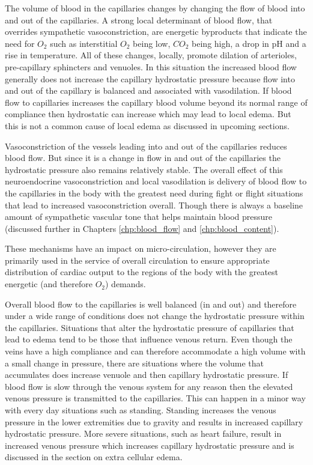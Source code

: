 The volume of blood in the capillaries changes by changing the flow of blood into and out of the capillaries. A strong local determinant of blood flow, that overrides sympathetic vasoconstriction, are energetic byproducts that indicate the need for $O_2$ such as interstitial $O_2$ being low, $CO_2$ being high, a drop in pH and a rise in temperature. All of these changes, locally, promote dilation of arterioles, pre-capillary sphincters and venuoles. In this situation the increased blood flow generally does not increase the capillary hydrostatic pressure because flow into and out of the capillary is balanced and associated with vasodilation. If blood flow to capillaries increases the capillary blood volume beyond its normal range of compliance then hydrostatic can increase which may lead to local edema. But this is not a common cause of local edema as discussed in upcoming sections.

Vasoconstriction of the vessels leading into and out of the capillaries reduces blood flow. But since it is a change in flow in and out of the capillaries the hydrostatic pressure also remains relatively stable. The overall effect of this neuroendocrine vasoconstriction and local vasodilation is delivery of blood flow to the capillaries in the body with the greatest need during fight or flight situations that lead to increased vasoconstriction overall. Though there is always a baseline amount of sympathetic vascular tone that helps maintain blood pressure (discussed further in Chapters \ref{chp:blood_flow} and \ref{chp:blood_content}).

These mechanisms have an impact on micro-circulation, however they are primarily used in the service of overall circulation to ensure appropriate distribution of cardiac output to the regions of the body with the greatest energetic (and therefore $O_2$) demands.

Overall blood flow to the capillaries is well balanced (in and out) and therefore under a wide range of conditions does not change the hydrostatic pressure within the capillaries. Situations that alter the hydrostatic pressure of capillaries that lead to edema tend to be those that influence venous return. Even though the veins have a high compliance and can therefore accommodate a high volume with a small change in pressure, there are situations where the volume that accumulates does increase venuole and then capillary hydrostatic pressure. If blood flow is slow through the venous system for any reason then the elevated venous pressure is transmitted to the capillaries. This can happen in a minor way with every day situations such as standing. Standing increases the venous pressure in the lower extremities due to gravity and results in increased capillary hydrostatic pressure. More severe situations, such as heart failure, result in increased venous pressure which increases capillary hydrostatic pressure and is discussed in the section on extra cellular edema.

